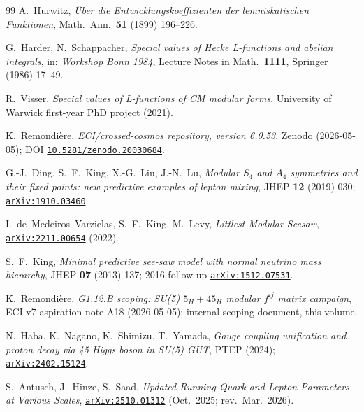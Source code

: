 \documentclass[a4paper,11pt]{article}
\newcommand{\arXiv}[1]{\href{https://arxiv.org/abs/#1}{\texttt{arXiv:#1}}}
\newcommand{\Zeno}{\href{https://doi.org/10.5281/zenodo.20030684}{\texttt{10.5281/zenodo.20030684}}}
\theoremstyle{definition}
\theoremstyle{remark}
\begin{document}
\begin{thebibliography}{99}
A.~Hurwitz,
\emph{\"Uber die Entwicklungskoeffizienten der lemniskatischen
Funktionen},
Math.~Ann.\ \textbf{51} (1899) 196--226.

G.~Harder, N.~Schappacher,
\emph{Special values of Hecke L-functions and abelian integrals},
in: \emph{Workshop Bonn 1984}, Lecture Notes in Math.\ \textbf{1111},
Springer (1986) 17--49.

R.~Visser,
\emph{Special values of L-functions of CM modular forms},
University of Warwick first-year PhD project (2021).

K.~Remondi\`ere,
\emph{ECI/crossed-cosmos repository, version 6.0.53},
Zenodo (2026-05-05);
DOI \Zeno.

G.-J.~Ding, S.~F.~King, X.-G.~Liu, J.-N.~Lu,
\emph{Modular $S_4$ and $A_4$ symmetries and their fixed points:
new predictive examples of lepton mixing},
JHEP \textbf{12} (2019) 030;
\arXiv{1910.03460}.

I.~de~Medeiros~Varzielas, S.~F.~King, M.~Levy,
\emph{Littlest Modular Seesaw},
\arXiv{2211.00654} (2022).

S.~F.~King,
\emph{Minimal predictive see-saw model with normal neutrino mass
hierarchy},
JHEP \textbf{07} (2013) 137; 2016 follow-up
\arXiv{1512.07531}.

K.~Remondi\`ere,
\emph{G1.12.B scoping: SU(5) $5_H+45_H$ modular $f^{ij}$ matrix
campaign},
ECI v7 aspiration note A18 (2026-05-05);
internal scoping document, this volume.

N.~Haba, K.~Nagano, K.~Shimizu, T.~Yamada,
\emph{Gauge coupling unification and proton decay via 45 Higgs boson
in SU(5) GUT},
PTEP (2024);
\arXiv{2402.15124}.

S.~Antusch, J.~Hinze, S.~Saad,
\emph{Updated Running Quark and Lepton Parameters at Various Scales},
\arXiv{2510.01312} (Oct.~2025; rev.\ Mar.~2026).


\end{thebibliography}
\end{document}
